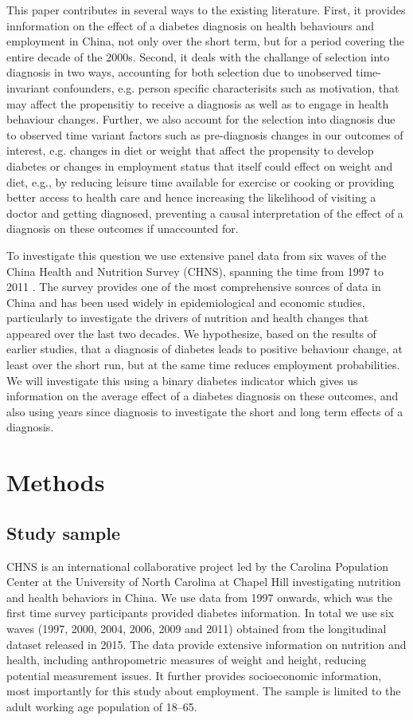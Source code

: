 This paper contributes in several ways to the existing literature. First, it provides innformation on the effect of a diabetes diagnosis on health behaviours and employment in China, not only over the short term, but for a period covering the entire decade of the 2000s. Second, it deals with the challange of selection into diagnosis in two ways, accounting for both selection due to unobserved time-invariant confounders, e.g. person specific characterisits such as motivation, that may affect the propensitiy to receive a diagnosis as well as to engage in health behaviour changes. Further, we also account for the selection into diagnosis due to observed time variant factors such as pre-diagnosis changes in our outcomes of interest, e.g. changes in diet or weight that affect the propensity to develop diabetes or changes in employment status that itself could effect on weight and diet, e.g., by reducing leisure time available for exercise or cooking or providing better access to health care and hence increasing the likelihood of visiting a doctor and getting diagnosed, preventing a causal interpretation of the effect of a diagnosis on these outcomes if unaccounted for.  

To investigate this question we use extensive panel data from six waves of the China Health and Nutrition Survey (CHNS), spanning the time from 1997 to 2011 . The survey provides one of the most comprehensive sources of data in China and has been used widely in epidemiological and economic studies, particularly to investigate the drivers of nutrition and health changes that appeared over the last two decades. We hypothesize, based on the results of earlier studies, that a diagnosis of diabetes leads to positive behaviour change, at least over the short run, but at the same time reduces employment probabilities. We will investigate this using a binary diabetes indicator which gives us information on the average effect of a diabetes diagnosis on these outcomes, and also using years since diagnosis to investigate the short and long term effects of a diagnosis. 
\section*{Methods}

\subsection*{Study sample}
CHNS is an international collaborative project led by the Carolina Population Center at the University of North Carolina at Chapel Hill investigating nutrition and health behaviors in China. We use data from 1997 onwards, which was the first time survey participants provided diabetes information. In total we use six waves (1997, 2000, 2004, 2006, 2009 and 2011) obtained from the longitudinal dataset released in 2015. The data provide extensive information on nutrition and health, including anthropometric measures of weight and height, reducing potential measurement issues. It further provides socioeconomic information, most importantly for this study about employment. The sample is limited to the adult working age population of 18--65.

